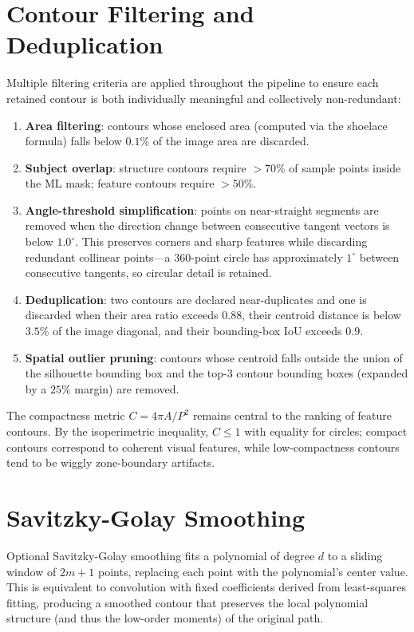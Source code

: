\documentclass[12pt,a4paper]{report}
\theoremstyle{thms}
\theoremstyle{defns}
\begin{document}
\section{Contour Filtering and Deduplication}
\label{sec:contour_filtering}

Multiple filtering criteria are applied throughout the pipeline to ensure each retained contour is both individually meaningful and collectively non-redundant:

\begin{enumerate}
    \item \textbf{Area filtering}: contours whose enclosed area (computed via the shoelace formula) falls below $0.1\%$ of the image area are discarded.
    \item \textbf{Subject overlap}: structure contours require $> 70\%$ of sample points inside the ML mask; feature contours require $> 50\%$.
    \item \textbf{Angle-threshold simplification}: points on near-straight segments are removed when the direction change between consecutive tangent vectors is below $1.0^{\circ}$. This preserves corners and sharp features while discarding redundant collinear points—a $360$-point circle has approximately $1^{\circ}$ between consecutive tangents, so circular detail is retained.
    \item \textbf{Deduplication}: two contours are declared near-duplicates and one is discarded when their area ratio exceeds $0.88$, their centroid distance is below $3.5\%$ of the image diagonal, and their bounding-box IoU exceeds $0.9$.
    \item \textbf{Spatial outlier pruning}: contours whose centroid falls outside the union of the silhouette bounding box and the top-3 contour bounding boxes (expanded by a $25\%$ margin) are removed.
\end{enumerate}

The compactness metric $C = 4\pi A / P^{2}$ remains central to the ranking of feature contours. By the isoperimetric inequality, $C \leq 1$ with equality for circles; compact contours correspond to coherent visual features, while low-compactness contours tend to be wiggly zone-boundary artifacts.

\section{Savitzky-Golay Smoothing}

Optional Savitzky-Golay smoothing fits a polynomial of degree $d$ to a sliding window of $2m+1$ points, replacing each point with the polynomial's center value. This is equivalent to convolution with fixed coefficients derived from least-squares fitting, producing a smoothed contour that preserves the local polynomial structure (and thus the low-order moments) of the original path.
\end{document}
